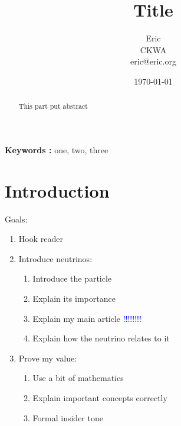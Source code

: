 \documentclass[a4paper,12pt]{article}
\begin{document}
\title{Title}
\author{Eric\\
\small{CKWA} \\
\small{eric@eric.org}}
\date{\today}
\maketitle

\begin{abstract}
This part put abstract
\end{abstract}

\textbf{Keywords :} one, two, three


\section{Introduction}

Goals:
\begin{enumerate} 
	\item Hook reader
	\item Introduce neutrinos:
	\begin{enumerate}[label=\arabic*.] %
		\item Introduce the particle
		\item Explain its importance
		\item Explain my main article \textcolor{blue}{!!!!!!!!} %
		\item Explain how the neutrino relates to it
	\end{enumerate}
	\item Prove my value:
	\begin{enumerate}[label=(\Alph*)] %
		\item Use a bit of mathematics
		\item Explain important concepts correctly
		\item Formal insider tone
	\end{enumerate}
\end{enumerate}
\end{document}
